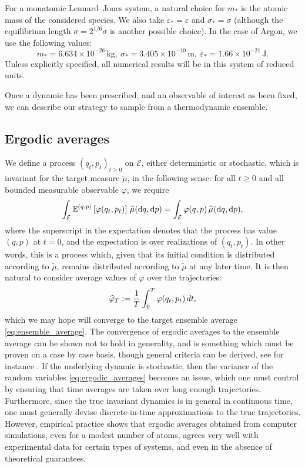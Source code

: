 For a monatomic Lennard--Jones system, a natural choice for $m_*$ is the atomic mass of the considered species. We also take $\varepsilon_*=\varepsilon$ and $\sigma_*=\sigma$ (although the equilibrium length $\sigma=2^{1/6}\sigma$ is another possible choice). In the case of Argon, we use the following values:
$$m_*=6.634 \times 10 ^{-26}\, \text{kg},\ \sigma_*=3.405 \times 10^{-10}\, \text{m},\ \varepsilon_*=1.66 \times 10^{-21}\, \text{J}.$$
Unless explicitly specified, all numerical results will be in this system of reduced units.

Once a dynamic has been prescribed, and an observable of interest as been fixed, we can describe our strategy to sample from a thermodynamic ensemble.

\subsection{Ergodic averages}
We define a process $(q_t,p_t)_{t\geq 0}$ on $\mathcal E$, either deterministic or stochastic, which is invariant for the target measure $\widetilde{\mu}$, in the following sense:
for all $t\geq 0$ and all bounded measurable observable $\varphi$, we require
\begin{equation}
    \label{eq:invariant_measure}
    \int_{\mathcal E}\mathbb{E}^{(q,p)}\left[ \varphi(q_t,p_t)\right]\,\widetilde{\mu}(\mathrm{d}q,\mathrm{d}p)=\int_{\mathcal E}\varphi(q,p)\,\widetilde{\mu}(\mathrm{d}q,\mathrm{d}p),
\end{equation}
where the superscript in the expectation denotes that the process has value $(q,p)$ at $t=0$, and the expectation is over realizations of $(q_t,p_t)$. In other words, this is a process which, given that its initial condition is distributed according to $\widetilde{\mu}$, remains distributed according to $\widetilde{\mu}$ at any later time. It is then natural to consider average values of $\varphi$ over the trajectories:
\begin{equation}
\label{eq:ergodic_averages}
 \widehat{\varphi}_T \mathrel{\mathop:}= \frac{1}{T}\int_{0}^T \varphi(q_t,p_t)\,dt,
\end{equation}
which we may hope will converge to the target ensemble average \eqref{eq:ensemble_average}. 
The convergence of ergodic averages to the ensemble average can be shown not to hold in generality, and is something which must be proven on a case by case basis, though general criteria can be derived, see for instance \cite{K87}.
If the underlying dynamic is stochastic, then the variance of the random variables \eqref{eq:ergodic_averages} becomes an issue, which one must control by ensuring that time averages are taken over long enough trajectories. 
Furthermore, since the true invariant dynamics is in general in continuous time, one must generally devise discrete-in-time approximations to the true trajectories.
However, empirical practice shows that ergodic averages obtained from computer simulations, even for a modest number of atoms, agrees very well with experimental data for certain types of systems, and even in the absence of theoretical guarantees.